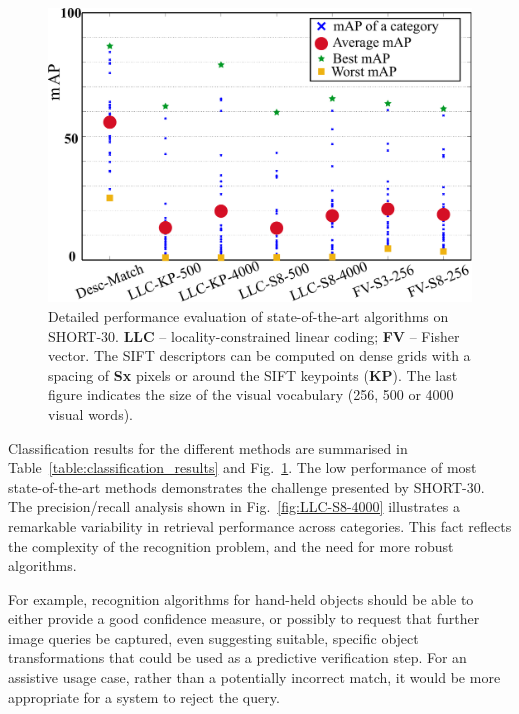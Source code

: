 \begin{figure}[]
\begin{center}
\includegraphics[width=\linewidth]{./gfx/Chapter03/methods-v5.pdf}
\caption{Detailed performance evaluation of state-of-the-art algorithms on SHORT-30. \textbf{LLC} -- locality-constrained linear coding; \textbf{FV} -- Fisher vector. The SIFT descriptors can be computed on dense grids with a spacing of \textbf{Sx} pixels or around the SIFT keypoints (\textbf{KP}). The last figure indicates the size of the visual vocabulary (256, 500 or 4000 visual words).}
\label{fig:methods}
\end{center}
\end{figure}




Classification results for the different methods are summarised in Table~\ref{table:classification_results}  and Fig.~\ref{fig:methods}. The low performance of most state-of-the-art methods demonstrates the challenge presented by SHORT-30. The precision/recall analysis shown in Fig.~\ref{fig:LLC-S8-4000} illustrates a remarkable variability in retrieval performance across categories. This fact reflects the complexity of the recognition problem, and the need for more robust algorithms. 

For example, recognition algorithms for hand-held objects should be able to either provide a good confidence measure, or possibly to request that further image queries be captured, even suggesting suitable, specific object transformations that could be used as a predictive verification step. For an assistive usage case, rather than a potentially incorrect match, it would be more appropriate for a system to reject the query.

